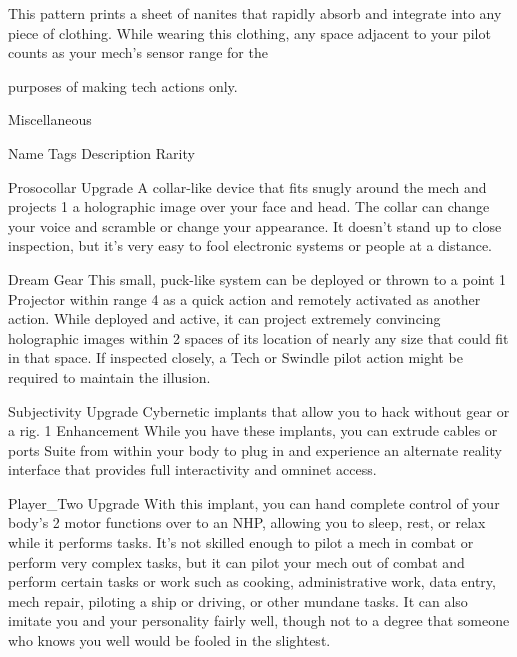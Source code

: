 This pattern prints a sheet of nanites that rapidly absorb and integrate into any piece of clothing. While
wearing this clothing, any space adjacent to your pilot counts as your mech’s sensor range for the

purposes of making tech actions only.


                                                 Miscellaneous

 Name                Tags        Description                                                               Rarity

 Prosocollar         Upgrade     A collar-like device that fits snugly around the mech and projects         1
                                 a holographic image over your face and head. The collar can
                                 change your voice and scramble or change your appearance. It
                                 doesn’t stand up to close inspection, but it’s very easy to fool
                                 electronic systems or people at a distance.




Dream                 Gear         This small, puck-like system can be deployed or thrown to a point                 1
Projector                          within range 4 as a quick action and remotely activated as another
                                   action. While deployed and active, it can project extremely
                                   convincing holographic images within 2 spaces of its location of
                                   nearly any size that could fit in that space. If inspected closely, a
                                   Tech or Swindle pilot action might be required to maintain the
                                   illusion.

Subjectivity          Upgrade      Cybernetic implants that allow you to hack without gear or a rig.                 1
Enhancement                        While you have these implants, you can extrude cables or ports
Suite                              from within your body to plug in and experience an alternate
                                   reality interface that provides full interactivity and omninet access.

Player\_Two            Upgrade      With this implant, you can hand complete control of your body’s                   2
                                   motor functions over to an NHP, allowing you to sleep, rest, or
                                   relax while it performs tasks. It’s not skilled enough to pilot a
                                   mech in combat or perform very complex tasks, but it can pilot
                                   your mech out of combat and perform certain tasks or work such
                                   as cooking, administrative work, data entry, mech repair, piloting a
                                   ship or driving, or other mundane tasks. It can also imitate you
                                   and your personality fairly well, though not to a degree that
                                   someone who knows you well would be fooled in the slightest.
